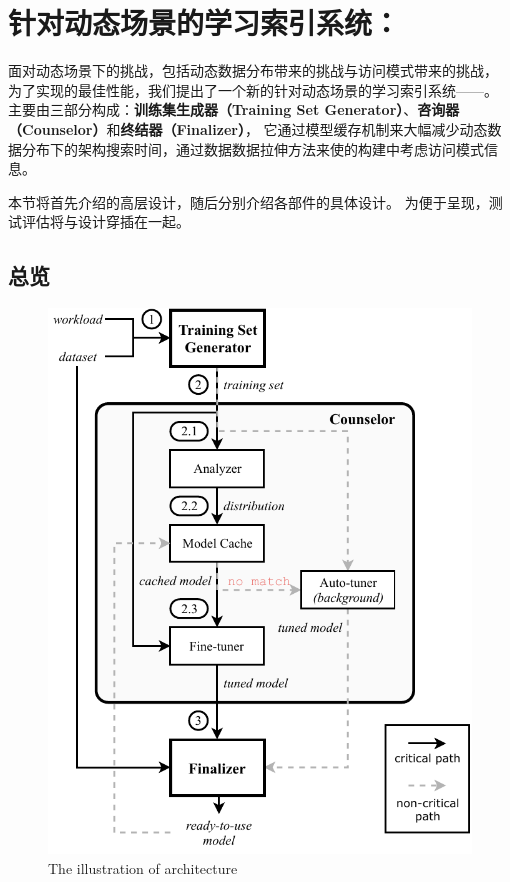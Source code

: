 \chapter{针对动态场景的学习索引系统：\sys}
\label{chap:sys}

面对动态场景下的挑战，包括动态数据分布带来的挑战与访问模式带来的挑战，
为了实现{\li}的最佳性能，我们提出了一个新的针对动态场景的学习索引系统{------}{\sys}。
{\sys}主要由三部分构成：\textbf{训练集生成器（Training Set Generator）}、\textbf{咨询器（Counselor）}和\textbf{终结器（Finalizer）}，
它通过模型缓存机制来大幅减少动态数据分布下的{\rmi}架构搜索时间，通过数据数据拉伸方法来使{\li}的构建中考虑访问模式信息。

本节将首先介绍{\sys}的高层设计，随后分别介绍{\sys}各部件的具体设计。
为便于呈现，测试评估将与设计穿插在一起。


\section{总览}

\begin{figure}[!ht]
  \centering
  \includegraphics{figure/Doraemon.pdf}
    {The illustration of \sys architecture}
  \label{fig:arch}
\end{figure}

